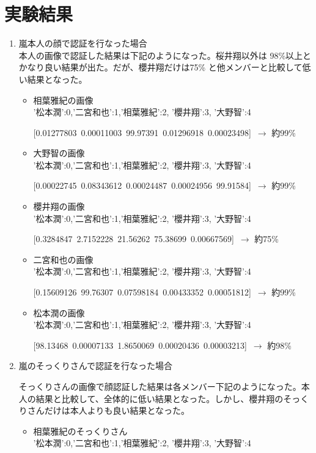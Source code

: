 \documentclass[a4paper, 11pt, titlepage]{jsarticle}
\begin{document}
\section{実験結果}
\begin{enumerate}
\item{嵐本人の顔で認証を行なった場合}\\
本人の画像で認証した結果は下記のようになった。桜井翔以外は 98\%以上とかなり良い結果が出た。だが、櫻井翔だけは75\% と他メンバーと比較して低い結果となった。\\
\begin{itemize}
\item{相葉雅紀の画像}\\
'松本潤':0,'二宮和也':1,'相葉雅紀':2, '櫻井翔':3, '大野智':4
 
[0.01277803\ 0.00011003\ 99.97391\ 0.01296918\ 0.00023498]\ $\rightarrow$ 約99\%
\item{大野智の画像}\\
'松本潤':0,'二宮和也':1,'相葉雅紀':2, '櫻井翔':3, '大野智':4

[0.00022745\ 0.08343612\ 0.00024487\ 0.00024956\ 99.91584]\ $\rightarrow$ 約99\%
\item{櫻井翔の画像}\\
'松本潤':0,'二宮和也':1,'相葉雅紀':2, '櫻井翔':3, '大野智':4

[0.3284847\ 2.7152228\ 21.56262\ 75.38699\ 0.00667569]\ $\rightarrow$ 約75\%
\item{二宮和也の画像}\\
'松本潤':0,'二宮和也':1,'相葉雅紀':2, '櫻井翔':3, '大野智':4

[0.15609126\ 99.76307\ 0.07598184\ 0.00433352\ 0.00051812]\ $\rightarrow$ 約99\%
\item{松本潤の画像}\\
'松本潤':0,'二宮和也':1,'相葉雅紀':2, '櫻井翔':3, '大野智':4

[98.13468\ 0.00007133\ 1.8650069\ 0.00020436\ 0.00003213]\ $\rightarrow$ 約98\% \\
\end{itemize}

\item{嵐のそっくりさんで認証を行なった場合}

そっくりさんの画像で顔認証した結果は各メンバー下記のようになった。本人の結果と比較して、全体的に低い結果となった。しかし、櫻井翔のそっくりさんだけは本人よりも良い結果となった。\\
\begin{itemize}
\item{相葉雅紀のそっくりさん}\\
'松本潤':0,'二宮和也':1,'相葉雅紀':2, '櫻井翔':3, '大野智':4


\end{itemize}
\end{enumerate}
\end{document}
